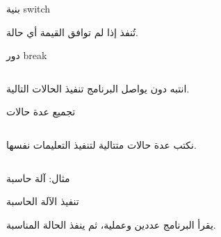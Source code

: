 \documentclass[aspectratio=169, 11pt, t, xcolor={table}]{beamer}
\begin{document}
\begin{frame}{بنية \textenglish{switch}}
    \begin{center}
    \begin{minipage}{0.62\textwidth}
    \end{minipage}
    \end{center}
    \vspace{0.3cm}
     تُنفذ إذا لم توافق القيمة أي حالة.
\end{frame}

\begin{frame}{دور \textenglish{break}}
    \begin{columns}[T]
    \end{columns}
    \vspace{0.3cm}
    \begin{obox}{\faExclamationTriangle\quad انتبه}
        دون  يواصل البرنامج تنفيذ الحالات التالية.
    \end{obox}
\end{frame}

\begin{frame}{تجميع عدة حالات}
    \begin{columns}[T]
        نكتب عدة حالات متتالية لتنفيذ التعليمات نفسها.
    \end{columns}
\end{frame}

\begin{frame}{مثال: آلة حاسبة}
    \begin{center}\begin{minipage}{0.75\textwidth}\end{minipage}\end{center}
\end{frame}

\begin{frame}{تنفيذ الآلة الحاسبة}
    \vspace{0.6cm}
    \begin{center}
        \begin{minipage}{0.45\textwidth}
        \end{minipage}
    \end{center}
    \vspace{0.3cm}
    يقرأ البرنامج عددين وعملية، ثم ينفذ الحالة المناسبة.
\end{frame}
\end{document}
